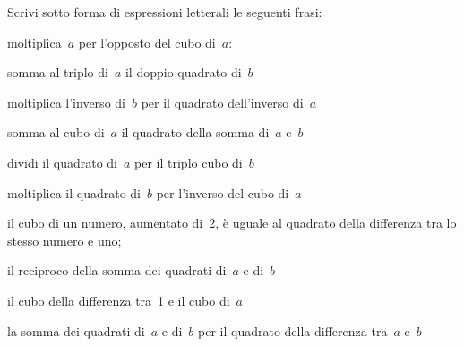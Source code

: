 \begin{multicols}{2}

\begin{esercizio}
\label{ese:8.12}
Scrivi sotto forma di espressioni letterali le seguenti frasi:
 \begin{enumeratea}
 \item moltiplica~\(a\) per l'opposto del cubo di~\(a\):
 \item somma al triplo di~\(a\) il doppio quadrato di~\(b\)
 \item moltiplica l'inverso di~\(b\) per il quadrato dell'inverso di~\(a\)
 \item somma al cubo di~\(a\) il quadrato della somma di~\(a\) e~\(b\)
 \item dividi il quadrato di~\(a\) per il triplo cubo di~\(b\)
 \item moltiplica il quadrato di~\(b\) per l'inverso del cubo di~\(a\)
 \item il cubo di un numero, aumentato di~2, è uguale al quadrato della 
   differenza tra lo stesso numero e uno;
 \item il reciproco della somma dei quadrati di~\(a\) e di~\(b\)
 \item il cubo della differenza tra~1 e il cubo di~\(a\)
 \item la somma dei quadrati di~\(a\) e di~\(b\) per il quadrato della 
   differenza tra~\(a\) e~\(b\)
 \end{enumeratea}
\end{esercizio}
\end{multicols}

\subsubsection*{}

